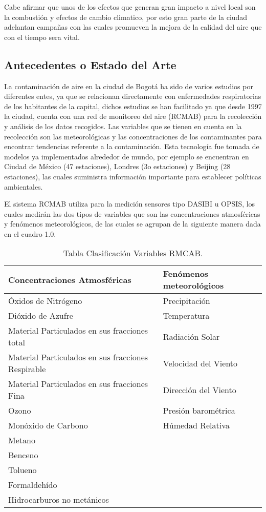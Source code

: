 \documentclass[a4paper, 11pt, oneside]{article}
\theoremstyle{definition}
\theoremstyle{remark}
\begin{document}
Cabe afirmar que unos de los efectos que generan gran impacto a nivel local son  la combustión y efectos de cambio climatico, por esto  gran parte de la ciudad adelantan campañas con las cuales promueven la mejora de la calidad del aire que con el tiempo sera vital.


\subsection{Antecedentes o Estado del Arte}
La contaminación de aire en la ciudad de Bogotá ha sido de varios estudios por diferentes entes, ya que se relacionan directamente con enfermedades respiratorias de los habitantes de la capital, dichos estudios se han facilitado ya que desde 1997 la ciudad, cuenta con una red de monitoreo del aire (RCMAB) para la recolección y análisis de los datos recogidos. Las variables que se tienen en cuenta en la recolección son las meteorológicas y las concentraciones de los contaminantes para encontrar tendencias referente a la contaminación. Esta tecnología fue tomada de modelos ya implementados alrededor de mundo, por ejemplo se encuentran en Ciudad de México  (47 estaciones), Londres (3o estaciones) y Beijing (28 estaciones), las cuales suministra información importante para establecer políticas ambientales.

El sistema RCMAB utiliza para la medición sensores tipo DASIBI u OPSIS, los cuales medirán las dos tipos de variables que son las concentraciones atmosféricas y fenómenos meteorológicos, de las cuales se agrupan de la siguiente manera dada en el cuadro 1.0.

\begin{table}[htbp]
\begin{center}
\begin{tabular}{|l|l|}
\hline
Concentraciones Atmosféricas & Fenómenos  meteorológicos \\
\hline \hline
Óxidos de Nitrógeno & Precipitación \\ \hline
Dióxido de Azufre & Temperatura \\ \hline
Material Particulados en sus fracciones total & Radiación Solar \\ \hline
Material Particulados en sus fracciones Respirable & Velocidad del Viento \\ \hline
Material Particulados en sus fracciones Fina & Dirección del Viento \\ \hline
Ozono & Presión barométrica \\ \hline
Monóxido de Carbono & Húmedad Relativa \\ \hline
Metano &  \\ \hline
Benceno &  \\ \hline
Tolueno &  \\ \hline
Formaldehído &  \\ \hline
Hidrocarburos no metánicos & \\ \hline
\end{tabular}
\caption{Tabla Clasificación Variables RMCAB.}
\label{tabla:sencilla}
\end{center}
\end{table}
\end{document}
